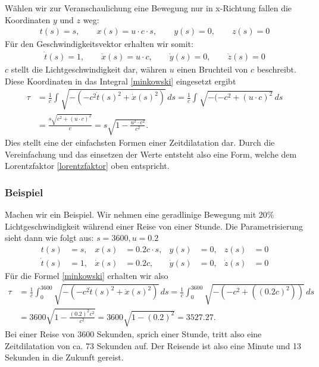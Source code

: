 \begin{refsection}
Wählen wir zur Veranschaulichung eine Bewegung nur in x-Richtung fallen die Koordinaten $y$ und $z$ weg:
\begin{align*}
     t(s)= s,
 	 \qquad x(s)=u\cdot c \cdot s,
     \qquad y(s)=0,
     \qquad z(s)=0 
\end{align*}
Für den Geschwindigkeitsvektor erhalten wir somit:
\begin{align*}
     \dot{t}(s)=1,
     \qquad\dot{x}(s)=u\cdot c,
     \qquad\dot{y}(s)=0,
     \qquad\dot{z}(s)=0
\end{align*}
$c$ stellt die Lichtgeschwindigkeit dar, währen $u$ einen Bruchteil von $c$ beschreibt.
Diese Koordinaten in das Integral \ref{minkowski} eingesetzt ergibt
\begin{align*}
\tau
&=
\frac{1}{c}\int_{}^{}\sqrt{-(-c^2\dot{t}(s)^2+\dot{x}(s)^2)}\,ds 
=
\frac{1}{c}\int_{}^{}\sqrt{-(-c^2 +(u\cdot c)^{2}}\,ds\\
&=
\frac{s\sqrt{c^2+(u\cdot c)^{2}}}{c} 
=
s\sqrt{1-\frac{u^2\cdot c^2}{c^2}}.
\end{align*}
Dies stellt eine der einfachsten Formen einer Zeitdilatation dar. Durch die Vereinfachung und das einsetzen der Werte entsteht also eine Form, welche dem Lorentzfaktor \eqref{lorentzfaktor} oben entspricht.

\subsubsection{Beispiel}
Machen wir ein Beispiel. Wir nehmen eine geradlinige Bewegung mit 20\% Lichtgeschwindigkeit während einer Reise von einer Stunde. Die Parametrisierung sieht dann wie folgt aus:
$s=3600, u=0.2$ 
\[
\begin{aligned}
t(s)&=s, & x(s)&=0.2c \cdot s, & y(s)&=0, & z(s)&=0 \\
\dot{t}(s)&=1, & \dot{x}(s)&=0.2c, & \dot{y}(s)&=0, & \dot{z}(s)&=0
\end{aligned}
\]
Für die Formel \eqref{minkowski} erhalten wir also
\begin{align*}
 \tau
&=
\frac{1}{c}\int_{0}^{3600}\sqrt{-(-c^2\dot{t}(s)^2+\dot{x}(s)^2)}\,ds
=
\frac{1}{c}\int_{0}^{3600}\sqrt{-(-c^2+((0.2c)^2))}\,ds\\
&=
3600\sqrt{1-\frac{(0.2)^2 c^2}{c^2}} 
=
3600\sqrt{1-(0.2)^2}
=
3527.27.
\end{align*}
Bei einer Reise von 3600 Sekunden, sprich einer Stunde, tritt also eine Zeitdilatation von ca. 73 Sekunden auf. Der Reisende ist also eine Minute und 13 Sekunden in die Zukunft gereist.


\end{refsection}
